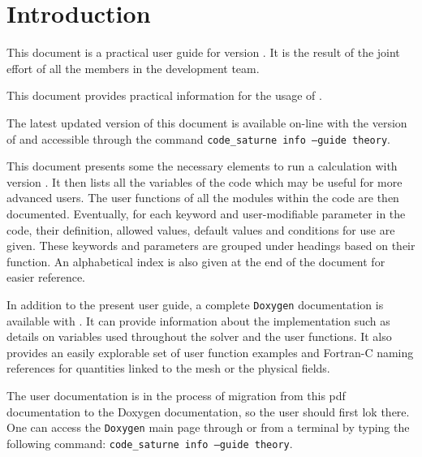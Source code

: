 
%
%
%
%


\nopagebreak
\section{Introduction}

This document is a practical user guide for \CS version \verscs.
It is the result of the joint effort of
all the members in the development team.

This document provides practical information for the usage of \CS.

The latest updated version of this document is available on-line with the version of \CS
and accessible through the command
\texttt{code\_saturne info --guide theory}.

This document presents some the necessary elements to run a calculation
with \CS version \verscs. It then lists all the variables of the code
which may be useful for more advanced users.
The user functions of all the modules within the code are then documented.
Eventually, for each keyword and user-modifiable parameter in the code,
their definition, allowed values, default values and conditions for use are given.
These keywords and parameters are grouped under headings
based on their function. An alphabetical index is also given at the end of
the document for easier reference.

In addition to the present user guide, a complete
\texttt{Doxygen} documentation is available with \CS. It can provide
information about the implementation such as details on variables used
throughout the solver and the user functions. It also provides an easily
explorable set of user function examples and Fortran-C naming references for
quantities linked to the mesh or the physical fields.

The user documentation is in the process of migration from this pdf documentation
to the Doxygen documentation, so the user should first lok there.
One can access the \texttt{Doxygen} main page through  or from a terminal by typing the following command:
\texttt{code\_saturne info --guide theory}.
